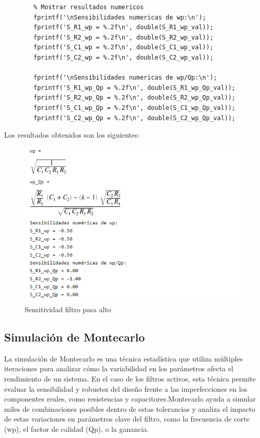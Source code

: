 \documentclass[12pt]{article}
\begin{document}
\begin{lstlisting}
		% Mostrar resultados numericos
		fprintf('\nSensibilidades numericas de wp:\n');
		fprintf('S_R1_wp = %.2f\n', double(S_R1_wp_val));
		fprintf('S_R2_wp = %.2f\n', double(S_R2_wp_val));
		fprintf('S_C1_wp = %.2f\n', double(S_C1_wp_val));
		fprintf('S_C2_wp = %.2f\n', double(S_C2_wp_val));
		
		fprintf('\nSensibilidades numericas de wp/Qp:\n');
		fprintf('S_R1_wp_Qp = %.2f\n', double(S_R1_wp_Qp_val));
		fprintf('S_R2_wp_Qp = %.2f\n', double(S_R2_wp_Qp_val));
		fprintf('S_C1_wp_Qp = %.2f\n', double(S_C1_wp_Qp_val));
		fprintf('S_C2_wp_Qp = %.2f\n', double(S_C2_wp_Qp_val));
	\end{lstlisting}
	Los resultados obtenidos son los siguientes:
	\begin{figure}[h!]
		\includegraphics[width=1\linewidth]{Simulaciones_Imagenes/Sensitividad_2}
		\caption[Sensitividad filtro pasa alto]{Sensitividad filtro pasa alto}
		\label{fig:sensitividad2}
	\end{figure}
	
	\subsection{Simulación de Montecarlo}
	La simulación de Montecarlo es una técnica estadística que utiliza múltiples iteraciones para analizar cómo la variabilidad en los parámetros afecta el rendimiento de un sistema. En el caso de los filtros activos, esta técnica permite evaluar la sensibilidad y robustez del diseño frente a las imperfecciones en los componentes reales, como resistencias y capacitores.Montecarlo ayuda a simular miles de combinaciones posibles dentro de estas tolerancias y analiza el impacto de estas variaciones en parámetros clave del filtro, como la frecuencia de corte (wp), el factor de calidad (Qp), o la ganancia.
	
\end{document}
